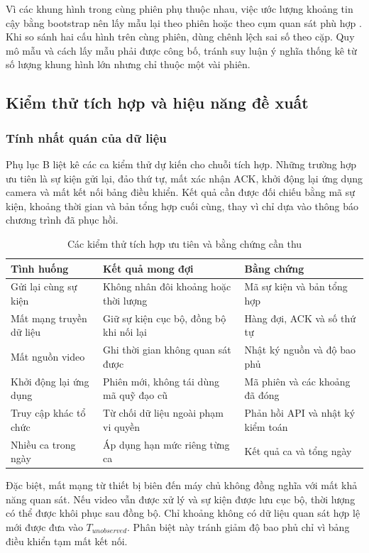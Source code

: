 Vì các khung hình trong cùng phiên phụ thuộc nhau, việc ước lượng khoảng tin cậy bằng bootstrap nên lấy mẫu lại theo phiên hoặc theo cụm quan sát phù hợp \cite{efron}. Khi so sánh hai cấu hình trên cùng phiên, dùng chênh lệch sai số theo cặp. Quy mô mẫu và cách lấy mẫu phải được công bố, tránh suy luận ý nghĩa thống kê từ số lượng khung hình lớn nhưng chỉ thuộc một vài phiên.

\subsection{Kiểm thử tích hợp và hiệu năng đề xuất}
\subsubsection{Tính nhất quán của dữ liệu}
Phụ lục B liệt kê các ca kiểm thử dự kiến cho chuỗi tích hợp. Những trường hợp ưu tiên là sự kiện gửi lại, đảo thứ tự, mất xác nhận ACK, khởi động lại ứng dụng camera và mất kết nối bảng điều khiển. Kết quả cần được đối chiếu bằng mã sự kiện, khoảng thời gian và bản tổng hợp cuối cùng, thay vì chỉ dựa vào thông báo chương trình đã phục hồi.

\begin{table}[H]
\centering\small
\caption{Các kiểm thử tích hợp ưu tiên và bằng chứng cần thu}
\label{tab:e2e-tests}
\begin{tabularx}{\textwidth}{p{3.1cm}X X}
\toprule
Tình huống & Kết quả mong đợi & Bằng chứng\\
\midrule
Gửi lại cùng sự kiện & Không nhân đôi khoảng hoặc thời lượng & Mã sự kiện và bản tổng hợp\\
Mất mạng truyền dữ liệu & Giữ sự kiện cục bộ, đồng bộ khi nối lại & Hàng đợi, ACK và số thứ tự\\
Mất nguồn video & Ghi thời gian không quan sát được & Nhật ký nguồn và độ bao phủ\\
Khởi động lại ứng dụng & Phiên mới, không tái dùng mã quỹ đạo cũ & Mã phiên và các khoảng đã đóng\\
Truy cập khác tổ chức & Từ chối dữ liệu ngoài phạm vi quyền & Phản hồi API và nhật ký kiểm toán\\
Nhiều ca trong ngày & Áp dụng hạn mức riêng từng ca & Kết quả ca và tổng ngày\\
\bottomrule
\end{tabularx}
\end{table}

Đặc biệt, mất mạng từ thiết bị biên đến máy chủ không đồng nghĩa với mất khả năng quan sát. Nếu video vẫn được xử lý và sự kiện được lưu cục bộ, thời lượng có thể được khôi phục sau đồng bộ. Chỉ khoảng không có dữ liệu quan sát hợp lệ mới được đưa vào $T_{unobserved}$. Phân biệt này tránh giảm độ bao phủ chỉ vì bảng điều khiển tạm mất kết nối.

